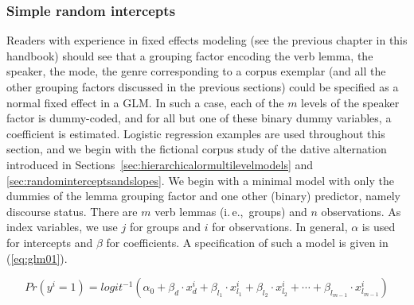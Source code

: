\documentclass[a4paper,12pt]{article}
\newcommand{\ie}{i.\,e.,\ }
\begin{document}
\subsubsection{Simple random intercepts}

Readers with experience in fixed effects modeling (see the previous chapter in this handbook) should see that a grouping factor encoding the verb lemma, the speaker, the mode, the genre corresponding to a corpus exemplar (and all the other grouping factors discussed in the previous sections) could be specified as a normal fixed effect in a GLM.
In such a case, each of the $m$ levels of the speaker factor is dummy-coded, and for all but one of these binary dummy variables, a coefficient is estimated.
Logistic regression examples are used throughout this section, and we begin with the fictional corpus study of the dative alternation introduced in Sections~\ref{sec:hierarchicalormultilevelmodels} and \ref{sec:randominterceptsandslopes}.
We begin with a minimal model with only the dummies of the lemma grouping factor and one other (binary) predictor, namely discourse status.
There are $m$ verb lemmas (\ie groups) and $n$ observations.
As index variables, we use $j$ for groups and $i$ for observations.
In general, $\alpha$ is used for intercepts and $\beta$ for coefficients.
A specification of such a model is given in (\ref{eq:glm01}).

\begin{equation}
  Pr(y^i=1)=logit^{-1}(\alpha_0+\beta_d\cdot x_{d}^i+\beta_{l_1}\cdot x_{l_1}^i+\beta_{l_2}\cdot x_{l_2}^i+\cdots+\beta_{l_{m-1}}\cdot x_{l_{m-1}}^i)
  \label{eq:glm01}
\end{equation}
\end{document}
